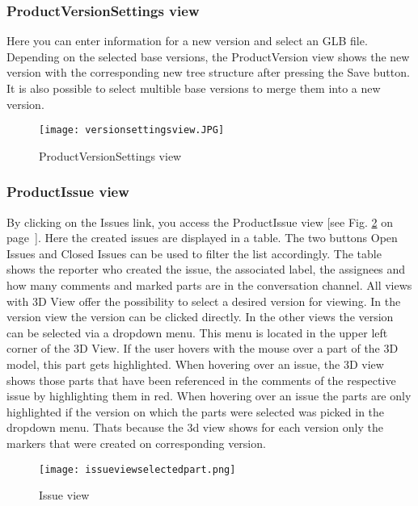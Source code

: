 \subsubsection*{ProductVersionSettings view}

Here you can enter information for a new version and select an GLB file. Depending on the selected base versions, the ProductVersion view shows the new version with the corresponding new tree structure after pressing the Save button. It is also possible to select multible base versions to merge them into a new version.

\begin{figure}[h]
    \centering
    \texttt{[image: versionsettingsview.JPG]}
    \caption{ProductVersionSettings view}
    \label{fig: versionsettingsview}
\end{figure}

\subsubsection*{ProductIssue view}

By clicking on the Issues link, you access the ProductIssue view [see Fig. \ref{fig: issueview} on page~\pageref{fig: issueview}]. Here the created issues are displayed in a table. The two buttons Open Issues and Closed Issues can be used to filter the list accordingly. The table shows the reporter who created the issue, the associated label, the assignees and how many comments and marked parts are in the conversation channel. 
All views with 3D View offer the possibility to select a desired version for viewing. In the version view the version can be clicked directly. In the other views the version can be selected via a dropdown menu. This menu is located in the upper left corner of the 3D View. 
If the user hovers with the mouse over a part of the 3D model, this part gets highlighted. 
When hovering over an issue, the 3D view shows those parts that have been referenced in the comments of the respective issue by highlighting them in red.
When hovering over an issue the parts are only highlighted if the version on which the parts were selected was picked in the dropdown menu. Thats because the 3d view shows for each version only the markers that were created on corresponding version.

\begin{figure}[h]
    \centering
    \texttt{[image: issueviewselectedpart.png]}
    \caption{Issue view}
    \label{fig: issueview}
\end{figure}

